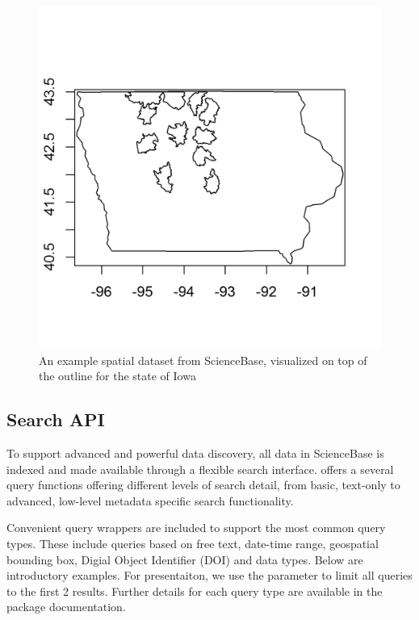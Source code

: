  \begin{figure}[htbp]
   \centering
   \includegraphics{mapfig}
   \caption{An example spatial dataset from ScienceBase, 
   visualized on top of the outline for the state of Iowa}
   \label{figure:iowafig}
 \end{figure}


\subsection{Search API}
To support advanced and powerful data discovery, all data 
in ScienceBase is indexed and made available through a flexible
search interface.  offers a several query
functions offering different levels of search detail, from
basic, text-only to advanced, low-level metadata specific search 
functionality. 


Convenient query wrappers are included to support the most common
query types. These include queries based on free text, date-time range, 
geospatial bounding box, Digial Object Identifier (DOI) and data types. 
Below are introductory examples. For presentaiton, we use the 
parameter to limit all queries to the first 2 results. Further details 
for each query type are available in the package documentation.


